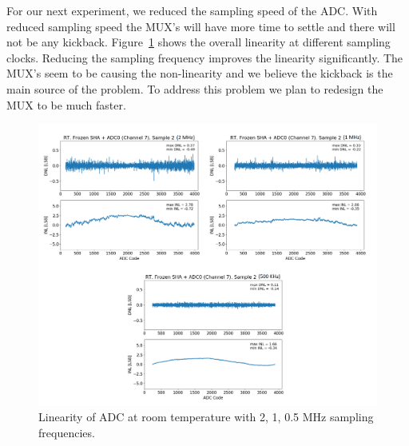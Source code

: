 For our next experiment, we reduced the sampling speed of the ADC. With reduced sampling speed the MUX's will have more time to settle and there will not be any kickback. Figure~\ref{fig:linearity_mux_speed} shows the overall linearity at different sampling clocks. Reducing the sampling frequency improves the linearity significantly. The MUX's seem to be causing the non-linearity and we believe the kickback is the main source of the problem. To address this problem we plan to redesign the MUX to be much faster.
\begin{figure}[h!]
\centering
  \includegraphics[width=1.0\linewidth]{figures/prakash_fig/linearity_mux_speed.png}
  \caption{Linearity of ADC at room temperature with 2, 1, 0.5 MHz sampling frequencies.}
  \label{fig:linearity_mux_speed}
\end{figure}

